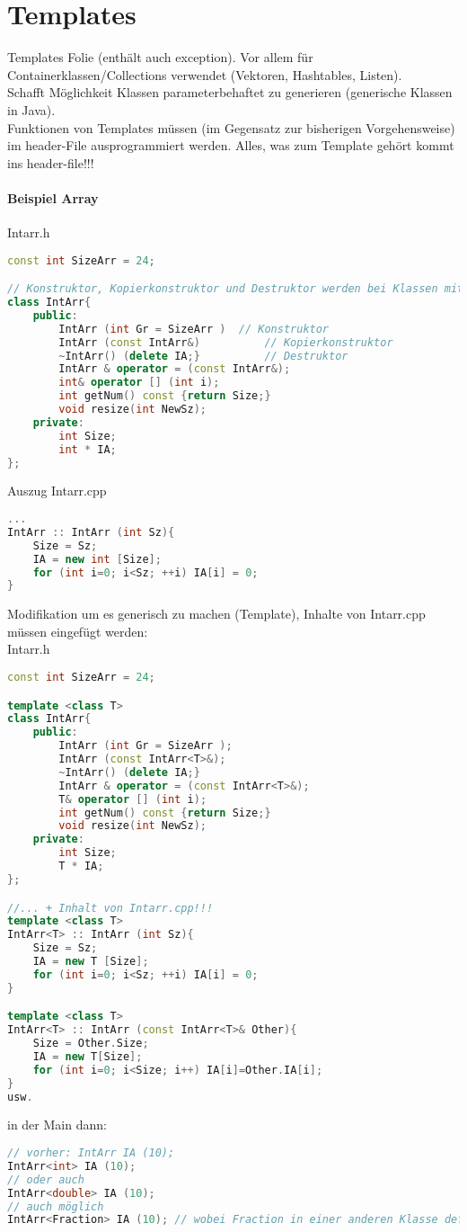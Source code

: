 \section{Templates}
Templates Folie (enthält auch exception).
Vor allem für Containerklassen/Collections verwendet (Vektoren, Hashtables, Listen).\\
Schafft Möglichkeit Klassen parameterbehaftet zu generieren (generische Klassen in Java).\\
Funktionen von Templates müssen (im Gegensatz zur bisherigen Vorgehensweise) im header-File ausprogrammiert werden. Alles, was zum Template gehört kommt ins header-file!!!
\paragraph{Beispiel Array} Intarr.h
\begin{lstlisting}[language=C++]
const int SizeArr = 24;

// Konstruktor, Kopierkonstruktor und Destruktor werden bei Klassen mit Pointer immer benötigt!
class IntArr{
	public:
		IntArr (int Gr = SizeArr ) 	// Konstruktor
		IntArr (const IntArr&) 			// Kopierkonstruktor
		~IntArr() (delete IA;}			// Destruktor
		IntArr & operator = (const IntArr&);
		int& operator [] (int i);	
		int getNum() const {return Size;}
		void resize(int NewSz);
	private:
		int Size;
		int * IA;
};
\end{lstlisting}
Auszug Intarr.cpp
\begin{lstlisting}[language=C++]
...
IntArr :: IntArr (int Sz){
	Size = Sz;
	IA = new int [Size];
	for (int i=0; i<Sz; ++i) IA[i] = 0;
}
\end{lstlisting}
Modifikation um es generisch zu machen (Template), Inhalte von Intarr.cpp müssen eingefügt werden:\\
Intarr.h
\begin{lstlisting}[language=C++]
const int SizeArr = 24;

template <class T>
class IntArr{
	public:
		IntArr (int Gr = SizeArr );
		IntArr (const IntArr<T>&);
		~IntArr() (delete IA;}
		IntArr & operator = (const IntArr<T>&);
		T& operator [] (int i);	
		int getNum() const {return Size;}
		void resize(int NewSz);
	private:
		int Size;
		T * IA;
};

//... + Inhalt von Intarr.cpp!!!
template <class T>
IntArr<T> :: IntArr (int Sz){
	Size = Sz;
	IA = new T [Size];
	for (int i=0; i<Sz; ++i) IA[i] = 0;
}

template <class T>
IntArr<T> :: IntArr (const IntArr<T>& Other){
	Size = Other.Size;
	IA = new T[Size];
	for (int i=0; i<Size; i++) IA[i]=Other.IA[i];
}
usw.
\end{lstlisting}
in der Main dann:
\begin{lstlisting}[language=C++]
// vorher: IntArr IA (10);
IntArr<int> IA (10);
// oder auch 
IntArr<double> IA (10);
// auch möglich 
IntArr<Fraction> IA (10); // wobei Fraction in einer anderen Klasse definiert ist.
\end{lstlisting}

